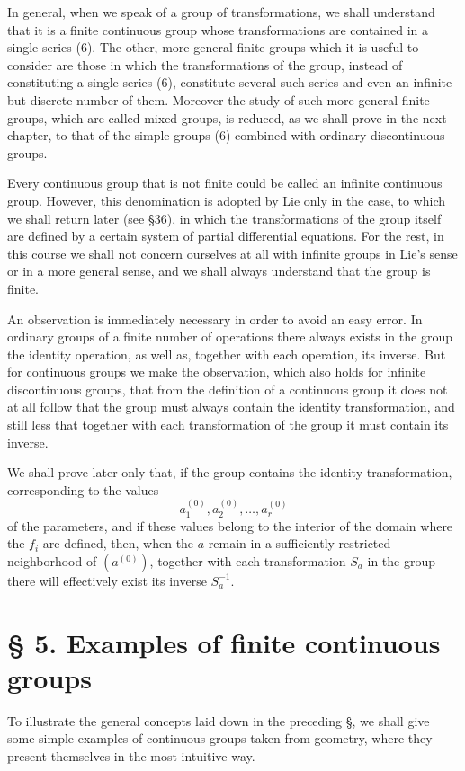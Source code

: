 \documentclass[11pt]{book}
\begin{document}
In general, when we speak of a group of transformations, we shall understand that it is a finite continuous group whose transformations are contained in a single series (6). The other, more general finite groups which it is useful to consider are those in which the transformations of the group, instead of constituting a single series (6), constitute several such series and even an infinite but discrete number of them. Moreover the study of such more general finite groups, which are called mixed groups, is reduced, as we shall prove in the next chapter, to that of the simple groups (6) combined with ordinary discontinuous groups.

Every continuous group that is not finite could be called an infinite continuous group. However, this denomination is adopted by Lie only in the case, to which we shall return later (see \S{}36), in which the transformations of the group itself are defined by a certain system of partial differential equations. For the rest, in this course we shall not concern ourselves at all with infinite groups in Lie's sense or in a more general sense, and we shall always understand that the group is finite.

An observation is immediately necessary in order to avoid an easy error. In ordinary groups of a finite number of operations there always exists in the group the identity operation, as well as, together with each operation, its inverse. But for continuous groups we make the observation, which also holds for infinite discontinuous groups, that from the definition of a continuous group it does not at all follow that the group must always contain the identity transformation, and still less that together with each transformation of the group it must contain its inverse.

We shall prove later only that, if the group contains the identity transformation, corresponding to the values
\[
 a_1^{(0)},a_2^{(0)},\ldots,a_r^{(0)}
\]
of the parameters, and if these values belong to the interior of the domain where the $f_i$ are defined, then, when the $a$ remain in a sufficiently restricted neighborhood of $(a^{(0)})$, together with each transformation $S_a$ in the group there will effectively exist its inverse $S_a^{-1}$.

\section*{\S{} 5. Examples of finite continuous groups}

To illustrate the general concepts laid down in the preceding \S{}, we shall give some simple examples of continuous groups taken from geometry, where they present themselves in the most intuitive way.
\end{document}
